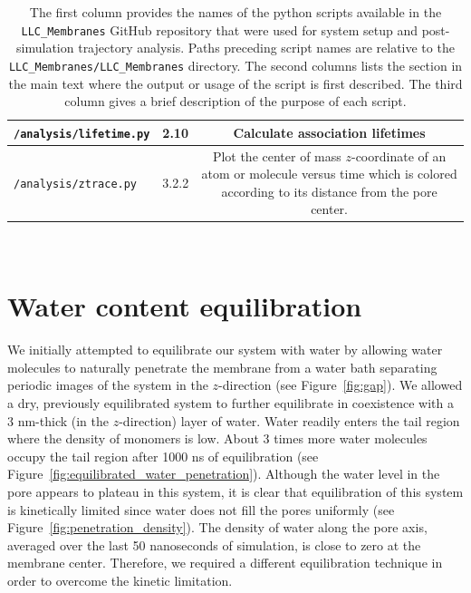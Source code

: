 \documentclass{article}
\begin{document}
\begin{table}[htb!]
\begin{tabular}{|A|B|C|}
  \texttt{/analysis/lifetime.py} & 2.10 & Calculate association lifetimes \\ \hline
  
  \texttt{/analysis/ztrace.py} & 3.2.2 & Plot the center of mass $z$-coordinate of an atom or molecule
  versus time which is colored according to its distance from the pore center. \\ \hline

  \end{tabular}

  \caption{The first column provides the names of the python scripts available in
  the \texttt{LLC\_Membranes} GitHub repository that were used for system setup and 
  post-simulation trajectory analysis. Paths preceding script names are relative to the
  \texttt{LLC\_Membranes/LLC\_Membranes} directory. The second columns lists the section in the main
  text where the output or usage of the script is first described. The third column
  gives a brief description of the purpose of each script.
  }~\label{table:python_scripts}

  \end{table}

  \section{Water content equilibration}\label{section:water_content_equil}

  We initially attempted to equilibrate our system with water by allowing water
  molecules to naturally penetrate the membrane from a water bath separating
  periodic images of the system in the $z$-direction (see Figure~\ref{fig:gap}).
  We allowed a dry, previously equilibrated system to further equilibrate in
  coexistence with a 3 nm-thick (in the $z$-direction) layer of water. Water
  readily enters the tail region where the density of monomers is low. About 3
  times more water molecules occupy the tail region after 1000 ns of
  equilibration (see Figure~\ref{fig:equilibrated_water_penetration}). Although
  the water level in the pore appears to plateau in this system, it is clear that
  equilibration of this system is kinetically limited since water does not fill
  the pores uniformly (see Figure~\ref{fig:penetration_density}). The density of
  water along the pore axis, averaged over the last 50 nanoseconds of simulation,
  is close to zero at the membrane center. Therefore, we required a different
  equilibration technique in order to overcome the kinetic limitation.
\end{document}
